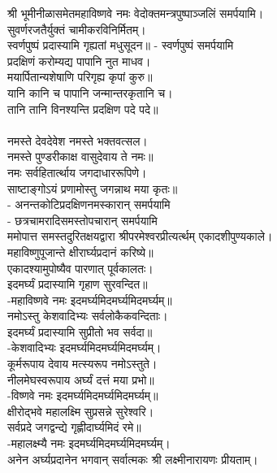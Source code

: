 श्री भूमीनीळासमेतमहाविष्णवे नमः वेदोक्तमन्त्रपुष्पाञ्जलिं समर्पयामि।\\

सुवर्णरजतैर्युक्तं चामीकरविनिर्मितम्।\\
स्वर्णपुष्पं प्रदास्यामि गृह्यतां मधुसूदन॥ - स्वर्णपुष्पं समर्पयामि\\
 
प्रदक्षिणं करोम्यद्य पापानि नुत माधव।\\
मयार्पितान्यशेषाणि परिगृह्य कृपां कुरु॥\\
 यानि कानि च पापानि जन्मान्तरकृतानि च।\\
तानि तानि विनश्यन्ति प्रदक्षिण पदे पदे॥\\
 \\
नमस्ते देवदेवेश नमस्ते भक्तवत्सल।\\
नमस्ते पुण्डरीकाक्ष वासुदेवाय ते नमः॥\\
नमः सर्वहितार्त्थाय जगदाधाररूपिणे।\\
साष्टाङ्गोऽयं प्रणामोस्तु जगन्नाथ मया कृतः॥\\
- अनन्तकोटिप्रदक्षिणनमस्कारान् समर्पयामि\\
 - छत्रचामरादिसमस्तोपचारान् समर्पयामि\\

ममोपात्त समस्तदुरितक्षयद्वारा श्रीपरमेश्वरप्रीत्यर्त्थम् एकादशीपुण्यकाले।\\
 महाविष्णुपूजान्ते क्षीरार्घ्यप्रदानं करिष्ये॥\\

एकादश्यामुपोष्यैव पारणात् पूर्वकालतः।\\
इदमर्घ्यं प्रदास्यामि गृहाण सुरवन्दित॥\\
	-महाविष्णवे नमः इदमर्घ्यमिदमर्घ्यमिदमर्घ्यम्॥\\
नमोऽस्तु केशवादिभ्यः सर्वलोकैकवन्दिताः।\\
इदमर्घ्यं प्रदास्यामि सुप्रीतो भव सर्वदा॥\\
	-केशवादिभ्यः इदमर्घ्यमिदमर्घ्यमिदमर्घ्यम्।\\
कूर्मरूपाय देवाय मत्स्यरूप नमोऽस्तुते। \\
नीलमेघस्वरूपाय अर्घ्यं दत्तं मया प्रभो॥\\
	-विष्णवे नमः इदमर्घ्यमिदमर्घ्यमिदमर्घ्यम्॥\\
 क्षीरोद्भवे महालक्ष्मि सुप्रसन्ने सुरेश्वरि।\\
सर्वप्रदे जगद्वन्द्ये गृह्णीदार्घ्यमिदं रमे॥ \\
	-महालक्ष्म्यै नमः इदमर्घ्यमिदमर्घ्यमिदमर्घ्यम्।\\
अनेन अर्घ्यप्रदानेन भगवान् सर्वात्मकः श्री लक्ष्मीनारायणः प्रीयताम्।\\

